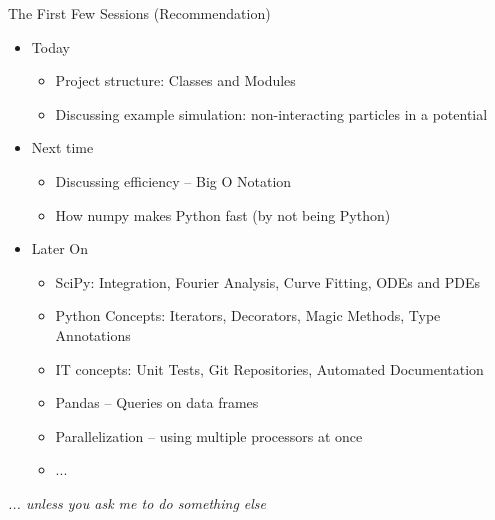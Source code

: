 \begin{frame}{The First Few Sessions (Recommendation)}
%
\begin{itemize}
\item Today
	\begin{itemize}
	\item Project structure: Classes and Modules
	\item Discussing example simulation: non-interacting particles in a potential
	\end{itemize}
\item Next time
	\begin{itemize}
	\item Discussing efficiency -- Big O Notation
	\item How numpy makes Python fast (by not being Python)
	\end{itemize}
\item Later On
	\begin{itemize}
	\item SciPy: Integration, Fourier Analysis, Curve Fitting, ODEs and PDEs
	\item Python Concepts: Iterators, Decorators, Magic Methods, Type Annotations
	\item IT concepts: Unit Tests, Git Repositories, Automated Documentation
	\item Pandas -- Queries on data frames
	\item Parallelization -- using multiple processors at once
	\item ...
	\end{itemize}
\end{itemize}
%
\begin{center}
\emph{... unless you ask me to do something else}
\end{center}
%
\end{frame}


